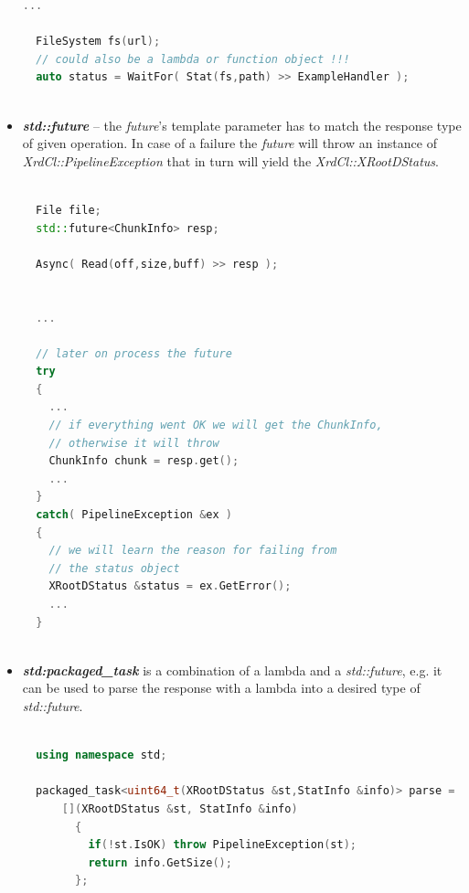 \documentclass{article}
\begin{document}
\begin{itemize}
\begin{samepage}
\begin{lstlisting}[language=C++, xleftmargin=\dimexpr-\leftmargini]
  ...
  
  FileSystem fs(url);
  // could also be a lambda or function object !!!
  auto status = WaitFor( Stat(fs,path) >> ExampleHandler ); 	
  
\end{lstlisting}
            
            \end{samepage}

            \item \begin{samepage} \textbf{\textit{std::future}} -- the \textit{future}'s template parameter has to match the response type of given operation. In case
            of a failure the \textit{future} will throw an instance of \textit{XrdCl::PipelineException} that in turn will yield the \textit{XrdCl::XRo\-otDStatus}. 
\pagebreak
\begin{lstlisting}[language=C++, xleftmargin=\dimexpr-\leftmargini]
  
  File file;
  std::future<ChunkInfo> resp;

  Async( Read(off,size,buff) >> resp );
  

  ...
  
  // later on process the future
  try
  {
    ...
    // if everything went OK we will get the ChunkInfo,
    // otherwise it will throw
    ChunkInfo chunk = resp.get();
    ...
  }
  catch( PipelineException &ex )
  { 	
    // we will learn the reason for failing from
    // the status object
    XRootDStatus &status = ex.GetError();
    ...
  }
  
\end{lstlisting}

            \end{samepage}

            \item \begin{samepage} \textbf{\textit{std:packaged_task}} is a combination of a lambda and a \textit{std::future}, e.g. it can be used to parse
            the response with a lambda into a desired type of \textit{std::future}.
            
\begin{lstlisting}[language=C++, xleftmargin=\dimexpr-\leftmargini]
  
  using namespace std;
  
  packaged_task<uint64_t(XRootDStatus &st,StatInfo &info)> parse = 
      [](XRootDStatus &st, StatInfo &info)
        {
          if(!st.IsOK) throw PipelineException(st);
          return info.GetSize();
        };
  

\end{lstlisting}
\end{samepage}
\end{itemize}
\end{document}
